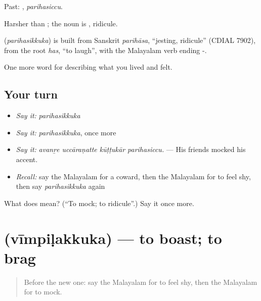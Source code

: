 Past: , \emph{parihasiccu}.

Harsher than ; the noun is , ridicule.

\begin{cousinweb}
\textbf{} (\emph{parihasikkuka}) is built from Sanskrit \emph{parihāsa}, \textquotedblleft{}jesting, ridicule\textquotedblright{} (CDIAL 7902), from the root \emph{has}, \textquotedblleft{}to laugh\textquotedblright{}, with the Malayalam verb ending -.
\end{cousinweb}

\begin{grammarlens}[title={What you've built}]
One more word for describing what you lived and felt.
\end{grammarlens}

\subsection*{Your turn}
\begin{itemize}
\raggedright
  \item \emph{Say it:} \emph{parihasikkuka}
  \item \emph{Say it:} \emph{parihasikkuka}, once more
  \item \emph{Say it:} \emph{avanṟe uccāraṇatte kūṭṭukār parihasiccu.} — His friends mocked his accent.
  \item \emph{Recall:} say the Malayalam for a coward, then the Malayalam for to feel shy, then say \emph{parihasikkuka} again
\end{itemize}

\begin{tcolorbox}[breakable,colback=teal!4,colframe=teal!35!black,title={Before you move on}]
What does  mean? (\textquotedblleft{}To mock; to ridicule\textquotedblright{}.) Say it once more.
\end{tcolorbox}
\section[\texorpdfstring{\ml{വീമ്പിളക്കുക} (vīmpiḷakkuka)}{വീമ്പിളക്കുക (vīmpiḷakkuka)}]{ (vīmpiḷakkuka) — to boast; to brag}

\label{lesson:ML-C531-vimpilakkuka}



\begin{quote}
Before the new one: say the Malayalam for to feel shy, then the Malayalam for to mock.
\end{quote}

